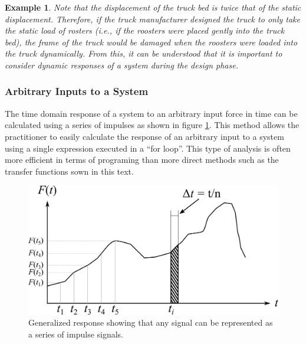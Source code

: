 \documentclass[12pt,letter]{article}
\newtheorem{ex}{Example}
\numberwithin{ex}{section} %
\newenvironment{example}{\begin{mdframed}[middlelinewidth=0.5mm]\begin{ex}\normalfont}{\end{ex}\end{mdframed}}
\numberwithin{re}{section} %
\begin{document}
\begin{example}
Note that the displacement of the truck bed is twice that of the static displacement. Therefore, if the truck manufacturer designed the truck to only take the static load of rosters (i.e., if the roosters were placed gently into the truck bed), the frame of the truck would be damaged when the roosters were loaded into the truck dynamically. From this, it can be understood that it is important to consider dynamic responses of a system during the design phase.


\end{example}

\subsubsection{Arbitrary Inputs to a System}
\label{sec:impulse_inputs}
The time domain response of a system to an arbitrary input force in time can be calculated using a series of impulses as shown in figure \ref{fig:Arbitary_excitation_forces}. This method allows the practitioner to easily calculate the response of an arbitrary input to a system using a single expression executed in a ``for loop''. This type of analysis is often more efficient in terms of programing than more direct methods such as the transfer functions sown in this text. 

\begin{figure}[H]
	\centering
	\includegraphics[]{../Figures/Arbitary_excitation_forces.png}
	\caption{Generalized response showing that any signal can be represented as a series of impulse signals. }
	\label{fig:Arbitary_excitation_forces}
\end{figure}
\end{document}
